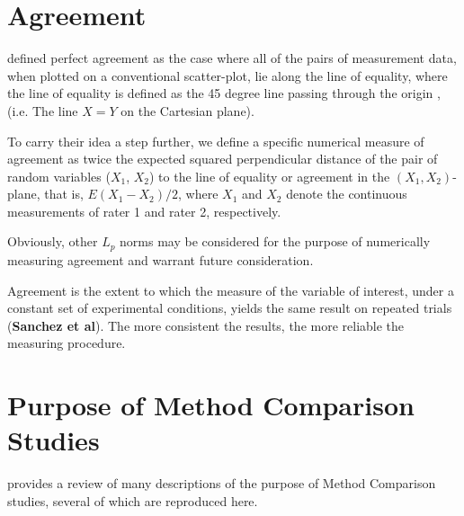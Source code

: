 \documentclass[12pt, a4paper]{report}
\theoremstyle{plain}
\theoremstyle{definition}
\theoremstyle{remark}
\begin{document}
	

	\section{Agreement}
	\citet{BA86} defined perfect agreement as the case where all of the pairs of measurement data, when plotted on a conventional scatter-plot, lie along the line of equality, where the line of equality is defined as the 45 degree line passing through the origin ,(i.e. The line $X=Y$ on the Cartesian plane). 
	
	To carry their idea a step further, we define a specific numerical measure of agreement as twice the expected squared perpendicular distance of the pair of random variables ($X_1$, $X_2$) to the line of equality or agreement in the $(X_1,X_2)$-plane, that is, $E(X_1 - X_2)/2$, where $X_1$ and $X_2$ denote the continuous measurements of rater 1 and rater 2, respectively.
	
	Obviously, other $L_p$ norms may be considered for the purpose of numerically measuring agreement and warrant future consideration. 
	
	
	Agreement is the extent to which the measure of the variable of interest, under a constant set of experimental conditions, yields the same result on repeated trials (\textbf{Sanchez et al}). The more consistent the results, the more reliable the measuring procedure.
	




	\section{Purpose of Method Comparison Studies}
	\citet{BXC2010} provides a review of many descriptions of the purpose of Method Comparison studies, several of which are reproduced here.
	
\end{document}
